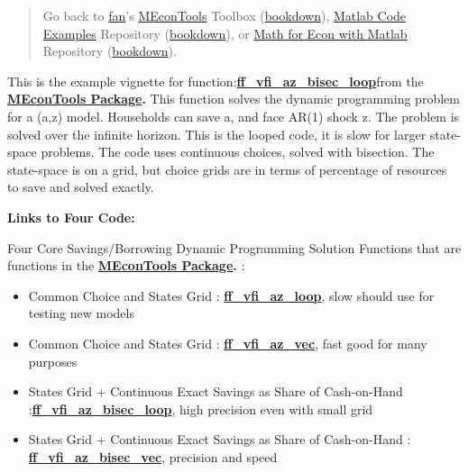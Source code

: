 \documentclass[
]{book}
\begin{document}
\begin{quote}
Go back to \href{http://fanwangecon.github.io/}{fan}'s \href{https://fanwangecon.github.io/MEconTools/}{MEconTools} Toolbox (\href{https://fanwangecon.github.io/MEconTools/bookdown}{bookdown}), \href{https://fanwangecon.github.io/M4Econ/}{Matlab Code Examples} Repository (\href{https://fanwangecon.github.io/M4Econ/bookdown}{bookdown}), or \href{https://fanwangecon.github.io/Math4Econ/}{Math for Econ with Matlab} Repository (\href{https://fanwangecon.github.io/Math4Econ/bookdown}{bookdown}).
\end{quote}

This is the example vignette for function:\href{https://github.com/FanWangEcon/MEconTools/blob/master/MEconTools/vfi/ff_vfi_az_bisec_loop.m}{\textbf{ff\_vfi\_az\_bisec\_loop}}from
the \href{https://fanwangecon.github.io/MEconTools/}{\textbf{MEconTools
Package}}\textbf{.} This function
solves the dynamic programming problem for a (a,z) model. Households can
save a, and face AR(1) shock z. The problem is solved over the infinite
horizon. This is the looped code, it is slow for larger state-space
problems. The code uses continuous choices, solved with bisection. The
state-space is on a grid, but choice grids are in terms of percentage of
resources to save and solved exactly.

\textbf{Links to Four Code:}

Four Core Savings/Borrowing Dynamic Programming Solution Functions that
are functions in the \href{https://fanwangecon.github.io/MEconTools/}{\textbf{MEconTools
Package}}\textbf{.} :

\begin{itemize}
\item
  Common Choice and States Grid :
  \href{https://github.com/FanWangEcon/MEconTools/blob/master/MEconTools/vfi/ff_vfi_az_loop.m}{\textbf{ff\_vfi\_az\_loop}},
  slow should use for testing new models
\item
  Common Choice and States Grid :
  \href{https://github.com/FanWangEcon/MEconTools/blob/master/MEconTools/vfi/ff_vfi_az_vec.m}{\textbf{ff\_vfi\_az\_vec}},
  fast good for many purposes
\item
  States Grid + Continuous Exact Savings as Share of Cash-on-Hand :\href{https://github.com/FanWangEcon/MEconTools/blob/master/MEconTools/vfi/ff_vfi_az_bisec_loop.m}{\textbf{ff\_vfi\_az\_bisec\_loop}},
  high precision even with small grid
\item
  States Grid + Continuous Exact Savings as Share of Cash-on-Hand :
  \href{https://github.com/FanWangEcon/MEconTools/blob/master/MEconTools/vfi/ff_vfi_az_bisec_vec.m}{\textbf{ff\_vfi\_az\_bisec\_vec}},
  precision and speed
\end{itemize}
\end{document}
